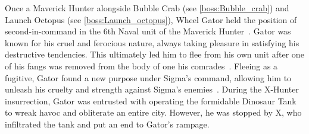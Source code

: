 Once a Maverick Hunter alongside Bubble Crab (see \ref{boss:Bubble_crab}) and Launch Octopus (see \ref{boss:Launch_octopus}), Wheel Gator held the position of second-in-command in the 6th Naval unit of the Maverick Hunter~\cite{Xcoll1:Manual_X2}. Gator was known for his cruel and ferocious nature, always taking pleasure in satisfying his destructive tendencies. This ultimately led him to flee from his own unit after one of his fangs was removed from the body of one his comrades~\cite{wayback:X2_resources}. Fleeing as a fugitive, Gator found a new purpose under Sigma's command, allowing him to unleash his cruelty and strength against Sigma's enemies~\cite{wiki:Wheel_gator}. During the X-Hunter insurrection, Gator was entrusted with operating the formidable Dinosaur Tank to wreak havoc and obliterate an entire city. However, he was stopped by X, who infiltrated the tank and put an end to Gator's rampage.

